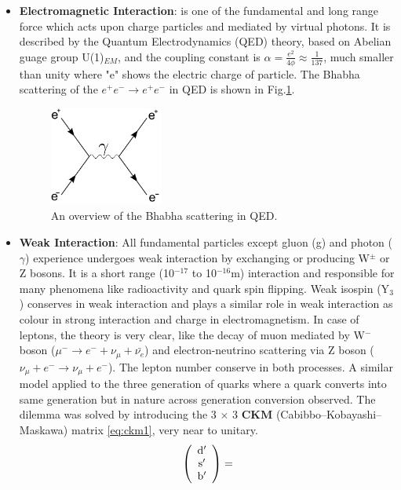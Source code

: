 \begin{itemize}
\item{\textbf{Electromagnetic Interaction}}: is one of the fundamental and long range force which acts upon charge particles and mediated by virtual photons. It is described by the Quantum Electrodynamics (QED) theory, based on Abelian guage group U(1)$_{EM}$, and the coupling constant is $\alpha = \frac{e^{2}}{4\phi} \approx \frac{1}{137}$, much smaller than unity where "e" shows the electric charge of particle. The Bhabha scattering of the $e^{+}e^{-} \rightarrow e^{+}e^{-}$ in QED is shown in Fig.\ref{fig:electro_force}.
\begin{figure}[h!]
\centering
\includegraphics[width=0.35\textwidth]{fig/chapt2/electromagnetic.png}
\caption{\label{fig:electro_force} An overview of the Bhabha scattering in QED.}
\end{figure}
\item{\textbf{Weak Interaction}}:
All fundamental particles except gluon (g) and photon ($\gamma$) experience undergoes weak interaction by exchanging or producing W$^{\pm}$ or Z bosons. It is a short range (10$^{-17}$ to 10$^{-16}$m) interaction and responsible for many phenomena like radioactivity and quark spin flipping. Weak isospin (Y$_{3}$) conserves in weak interaction and plays a similar role in weak interaction as colour in strong interaction and charge in electromagnetism. In case of leptons, the theory is very clear, like the decay of muon mediated by W$^{-}$ boson ($\mu^{-} \rightarrow e^{-} + \nu_{\mu} + \bar{\nu_{e}}$) and electron-neutrino scattering via Z boson ($\nu_{\mu} + e^{-} \rightarrow \nu_{\mu} + e^{-}$). The lepton number conserve in both processes. A similar model applied to the three generation of quarks where a quark converts into same generation but in nature across generation conversion observed. The dilemma was solved by introducing the 3 $\times$ 3 $\textbf{CKM}$ (Cabibbo–Kobayashi–Maskawa) matrix \ref{eq:ckm1}, very near to unitary.
\begin{equation}\label{eq:ckm1}
\left({\begin{array}{ccc} \rm d' \\ \rm s' \\ \rm b' \end{array}}\right) = 

\end{equation}
\end{itemize}

